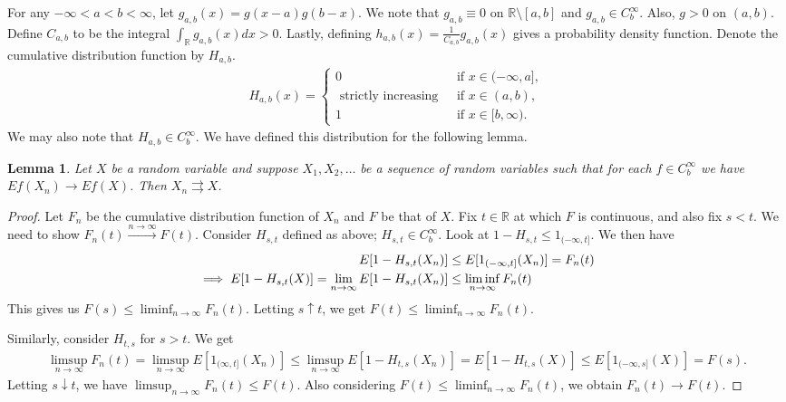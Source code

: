 \documentclass[15pt,a4paper]{book}
\newtheorem{lemma}[theorem]{Lemma}
\theoremstyle{definition}
\newcommand{\R}{\mathbb{R}}
\newcommand{\toup}[1]{\xrightarrow{#1}}
\begin{document}
For any $-\infty < a < b < \infty$, let $g_{a,b}(x)=g(x-a)g(b-x)$. We note that $g_{a,b} \equiv 0$ on $\R\setminus[a,b]$ and $g_{a,b} \in C_{b}^{\infty}$. Also, $g > 0$ on $(a,b)$. Define $C_{a,b}$ to be the integral $\int_{\R} g_{a,b}(x)dx > 0$. Lastly, defining $h_{a,b}(x) = \frac{1}{C_{a,b}}g_{a,b}(x)$ gives a probability density function. Denote the cumulative distribution function by $H_{a,b}$.
\begin{align}
    H_{a,b}(x) = \begin{cases}
        0 &\text{ if } x \in (-\infty,a],\\
        \text{ strictly increasing } &\text{ if } x \in (a,b),\\
        1 &\text{ if } x \in [b,\infty).
    \end{cases}
\end{align}
We may also note that $H_{a,b} \in C_{b}^{\infty}$. We have defined this distribution for the following lemma.

\begin{lemma}
    Let $X$ be a random variable and suppose $X_{1},X_{2},\ldots$ be a sequence of random variables such that for each $f \in C_{b}^{\infty}$ we have $Ef(X_{n}) \to Ef(X)$. Then $X_{n} \rightrightarrows X$.
\end{lemma}
\begin{proof}
    Let $F_{n}$ be the cumulative distribution function of $X_{n}$ and $F$ be that of $X$. Fix $t \in \R$ at which $F$ is continuous, and also fix $s < t$. We need to show $F_{n}(t) \toup{n \to \infty} F(t)$. Consider $H_{s,t}$ defined as above; $H_{s,t} \in C_{b}^{\infty}$. Look at $1-H_{s,t} \leq 1_{(-\infty,t]}$. We then have
    \begin{align}
        E[1-H_{s,t}(X_{n})] &\leq E[1_{(-\infty,t]}(X_{n})] = F_{n}(t) \notag \\
        \implies E[1-H_{s,t}(X)] = \lim_{n \to \infty} E[1-H_{s,t}(X_{n})] &\leq \liminf_{n \to \infty} F_{n}(t)
    \end{align}
    This gives us $F(s) \leq \liminf_{n \to \infty} F_{n}(t)$. Letting $s \uparrow t$, we get $F(t) \leq \liminf_{n \to \infty} F_{n}(t)$.

    Similarly, consider $H_{t,s}$ for $s > t$. We get
    \begin{align}
        \limsup_{n \to \infty} F_{n}(t) = \limsup_{n \to \infty} E[1_{(\infty,t]}(X_{n})] \leq \limsup_{n \to \infty} E[1-H_{t,s}(X_{n})] = E[1-H_{t,s}(X)] \leq E[1_{(-\infty,s]}(X)] = F(s).
    \end{align}
    Letting $s \downarrow t$, we have $\limsup_{n \to \infty} F_{n}(t) \leq F(t)$. Also considering $F(t) \leq \liminf_{n \to \infty} F_{n}(t)$, we obtain $F_{n}(t) \to F(t)$.
\end{proof}
\end{document}

